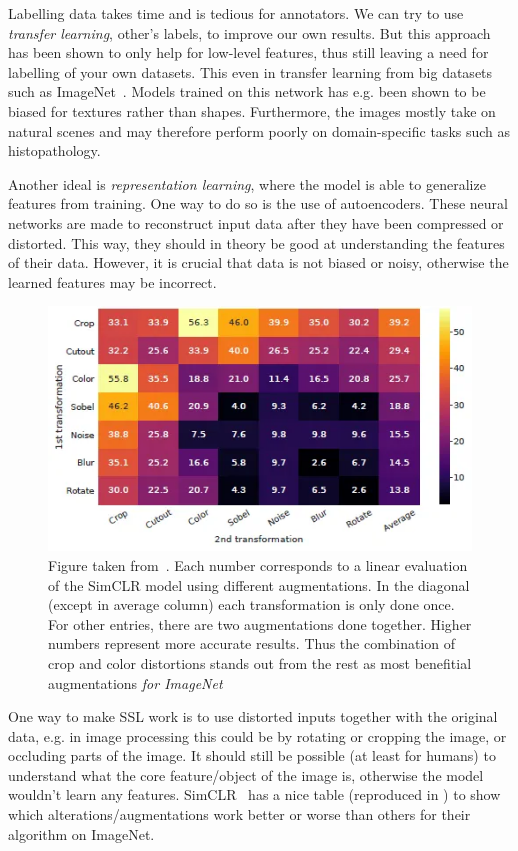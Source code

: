 \documentclass[10pt,twocolumn,letterpaper]{article}
\begin{document}
Labelling data takes time and is tedious for annotators. We can try to use \textit{transfer learning}, other's labels, to improve our own results. But this approach has been shown to only help for low-level features, thus still leaving a need for labelling of your own datasets. This even in transfer learning from big datasets such as ImageNet~\cite{imageNet}. Models trained on this network has e.g. been shown to be biased for textures rather than shapes. Furthermore, the images mostly take on natural scenes and may therefore perform poorly on domain-specific tasks such as histopathology.

Another ideal is \textit{representation learning}, where the model is able to generalize features from training. One way to do so is the use of autoencoders. These neural networks are made to reconstruct input data after they have been compressed or distorted. This way, they should in theory be good at understanding the features of their data. However, it is crucial that data is not biased or noisy, otherwise the learned features may be incorrect.

\begin{figure}
  \includegraphics[scale=.5]{simCLR.png}
  \caption{Figure taken from~\cite{simCLR}. Each number corresponds to a linear evaluation of the SimCLR model using different augmentations. In the diagonal (except in average column) each transformation is only done once. For other entries, there are two augmentations done together. Higher numbers represent more accurate results. Thus the combination of crop and color distortions stands out from the rest as most benefitial augmentations \textit{for ImageNet}}
\label{fig:simCLR}
\end{figure}

One way to make \gls{SSL} work is to use distorted inputs together with the original data, e.g. in image processing this could be by rotating or cropping the image, or occluding parts of the image. It should still be possible (at least for humans) to understand what the core feature/object of the image is, otherwise the model wouldn't learn any features. SimCLR~\cite{simCLR} has a nice table (reproduced in ) to show which alterations/augmentations work better or worse than others for their algorithm on ImageNet.
\end{document}
